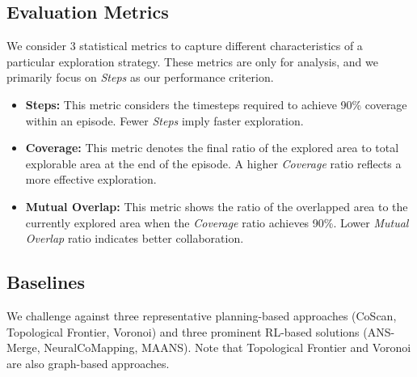 % 


\subsection{Evaluation Metrics}
We consider 3 statistical metrics to capture different characteristics of a particular exploration strategy. These metrics are only for analysis, and we primarily focus on \emph{Steps} as our performance criterion.

\begin{itemize}
\setlength{\parskip}{0pt} \setlength{\itemsep}{0pt plus 1pt}
    \item \textbf{Steps:  }This metric considers the timesteps required to achieve 90\% coverage within an episode. Fewer \emph{Steps} imply faster exploration.
    \item \textbf{Coverage:  }This metric denotes the final ratio of the explored area to total explorable area at the end of the episode. A higher \emph{Coverage} ratio reflects a more effective exploration.
    \item \textbf{Mutual Overlap: }This metric shows the ratio of the overlapped area to the currently explored area when the \emph{Coverage} ratio achieves 90\%. Lower \emph{Mutual Overlap} ratio indicates better collaboration.
\end{itemize}
\vspace{-\topsep}


\subsection{Baselines}
We challenge {\name} against three representative planning-based approaches (CoScan, Topological Frontier, Voronoi) and three prominent RL-based solutions (ANS-Merge, NeuralCoMapping, MAANS). Note that Topological Frontier and Voronoi are also graph-based approaches.

